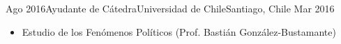 \begin{experiences}
  \emptySeparator 
  \experience 
    {Ago 2016}{Ayudante de Cátedra}{Universidad de Chile}{Santiago, Chile} {Mar 2016}
    {\begin{itemize}
    \item Estudio de los Fenómenos Políticos {\small (Prof. Bastián González-Bustamante)}
    \end{itemize}}
    {}
\end{experiences}
